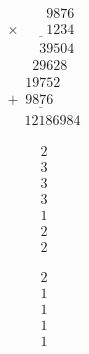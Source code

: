 \begin{minipage}[t]{0.3\linewidth}\flushright
\begin{equation*}\begin{array}{c}
\phantom{\times0000}9876\\
\underline{\times\phantom{0000}1234}\\
\phantom{+000}39504\\
\phantom{+00}29628\phantom0\\
\phantom{+0}19752\phantom0\phantom0\\
\underline{+\phantom{0}9876\phantom0\phantom0\phantom0}\\
\phantom{+}12186984
\end{array}\end{equation*}
\end{minipage}
\begin{minipage}[t]{0.1\linewidth}\flushleft\begin{align*}
2 \\
3 \\
3 \\
3 \\
1 \\
2 \\
2
\end{align*}\end{minipage}
\begin{minipage}[t]{0.1\linewidth}\flushleft\begin{align*}
2 \\
1 \\
1 \\
1 \\
1
\end{align*}\end{minipage}
